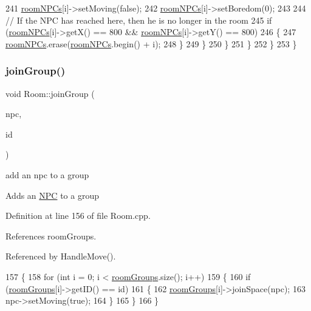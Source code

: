 \begin{DoxyCode}
241                     \hyperlink{class_room_a34bdf24cc8c52d638bcfd851c295f23b}{roomNPCs}[i]->setMoving(\textcolor{keyword}{false});
242                     \hyperlink{class_room_a34bdf24cc8c52d638bcfd851c295f23b}{roomNPCs}[i]->setBoredom(0);
243 
244                     \textcolor{comment}{// If the NPC has reached here, then he is no longer in the room}
245                     \textcolor{keywordflow}{if} (\hyperlink{class_room_a34bdf24cc8c52d638bcfd851c295f23b}{roomNPCs}[i]->getX() == 800 && \hyperlink{class_room_a34bdf24cc8c52d638bcfd851c295f23b}{roomNPCs}[i]->getY() == 800)
246                     \{
247                         \hyperlink{class_room_a34bdf24cc8c52d638bcfd851c295f23b}{roomNPCs}.erase(\hyperlink{class_room_a34bdf24cc8c52d638bcfd851c295f23b}{roomNPCs}.begin() + i);
248                     \}
249                 \}
250             \}
251         \}
252     \}
253 \}
\end{DoxyCode}
\mbox{\label{class_room_a8cf434656fbafb4d65ee47c33db5c8ed}} 
\subsubsection{\texorpdfstring{join\+Group()}{joinGroup()}}
{\footnotesize\ttfamily void Room\+::join\+Group (\begin{DoxyParamCaption}\item[{std\+::shared\+\_\+ptr$<$ \hyperlink{class_n_p_c}{N\+PC} $>$}]{npc,  }\item[{int}]{id }\end{DoxyParamCaption})}



add an npc to a group 

Adds an \hyperlink{class_n_p_c}{N\+PC} to a group 

Definition at line 156 of file Room.\+cpp.



References room\+Groups.



Referenced by Handle\+Move().


\begin{DoxyCode}
157 \{
158     \textcolor{keywordflow}{for} (\textcolor{keywordtype}{int} i = 0; i < \hyperlink{class_room_a2d63fa17f30d50dd5267f04170a662b0}{roomGroups}.size(); i++)
159     \{
160         \textcolor{keywordflow}{if} (\hyperlink{class_room_a2d63fa17f30d50dd5267f04170a662b0}{roomGroups}[i]->getID() == id)
161         \{
162             \hyperlink{class_room_a2d63fa17f30d50dd5267f04170a662b0}{roomGroups}[i]->joinSpace(npc);
163             npc->setMoving(\textcolor{keyword}{true});
164         \}
165     \}
166 \}
\end{DoxyCode}
\mbox{\label{class_room_af6bdbbf116aeafe290a31990a1124562}} 
